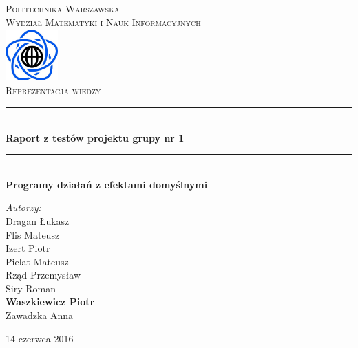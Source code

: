 \documentclass{article}
\begin{document}
	
\begin{titlepage}

\newcommand{\HRule}{\rule{\linewidth}{0.5mm}}
\newcommand{\Action}[1]{\textsc{#1}}

\center


\textsc{\LARGE Politechnika Warszawska}\\[0.3cm]
\textsc{\Large Wydział Matematyki i Nauk Informacyjnych}\\[0.6cm]

\includegraphics[width=2cm, height=2cm]{logo}\\[0.6cm]


\textsc{\Huge Reprezentacja wiedzy}\\[0.3cm]


\HRule \\[0.4cm]
{ \LARGE \bfseries Raport z testów projektu grupy nr 1}\\[0.1cm]
 

\HRule \\[0.4cm]
{  \bfseries Programy działań z efektami domyślnymi}\\[1.2cm]

\begin{flushright}
\Large \emph{Autorzy:}\\[0.5cm]
Dragan Łukasz\\
Flis Mateusz\\
Izert Piotr\\
Pielat Mateusz\\
Rząd Przemysław\\
Siry Roman\\
\textbf{Waszkiewicz Piotr}\\
Zawadzka Anna\\[0.9cm]

\end{flushright}

\vfill
{\large 14 czerwca 2016}\\[1cm]
	


\end{titlepage}
	
\end{document}
